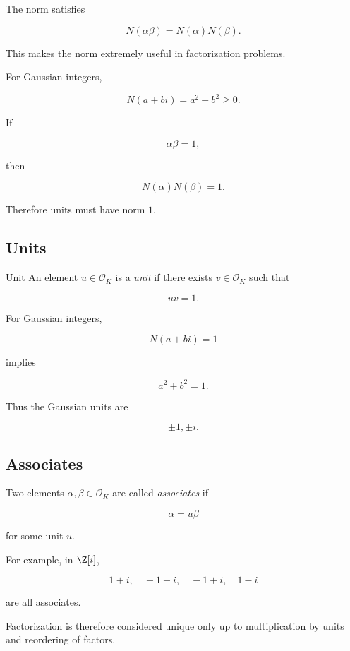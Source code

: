 The norm satisfies

\[ \boxed{N(\alpha\beta)=N(\alpha)N(\beta).} \]

This makes the norm extremely useful in factorization problems.

For Gaussian integers,

\[ N(a+bi)=a^2+b^2\geq0. \]

If

\[ \alpha\beta=1, \]

then

\[ N(\alpha)N(\beta)=1. \]

Therefore units must have norm \(1\).

\subsection{Units}
\label{subsec:number-field-units}

\begin{definitionbox}{Unit}
An element \(u\in\mathcal O_K\) is a \emph{unit} if there exists
\(v\in\mathcal O_K\) such that

\[ uv=1. \]
\end{definitionbox}

For Gaussian integers,

\[ N(a+bi)=1 \]

implies

\[ a^2+b^2=1. \]

Thus the Gaussian units are

\[ \boxed{\pm1,\pm i.} \]

\subsection{Associates}
\label{subsec:associates-number-fields}

Two elements \(\alpha,\beta\in\mathcal O_K\) are called
\emph{associates} if

\[ \alpha=u\beta \]

for some unit \(u\).

For example, in \(\Z[i]\),

\[ 1+i,\quad -1-i,\quad -1+i,\quad1-i \]

are all associates.

Factorization is therefore considered unique only up to multiplication by
units and reordering of factors.

